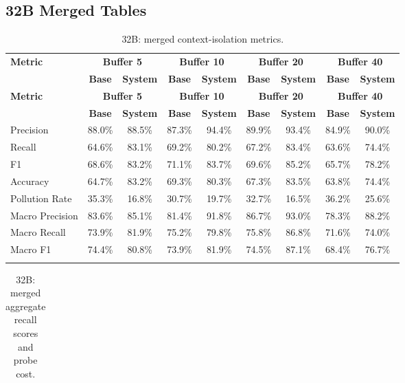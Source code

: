 \begin{landscape}
\subsection{32B Merged Tables}\label{app:32b_merged}
\tiny
\begin{longtable}{@{}p{3.8cm}cccccccc@{}}
\caption{32B: merged context-isolation metrics.}\label{tab:app_32b_context}\\

\toprule
\textbf{Metric} & \multicolumn{2}{c}{\textbf{Buffer 5}} & \multicolumn{2}{c}{\textbf{Buffer 10}} & \multicolumn{2}{c}{\textbf{Buffer 20}} & \multicolumn{2}{c}{\textbf{Buffer 40}} \\
\cmidrule(lr){2-3}\cmidrule(lr){4-5}\cmidrule(lr){6-7}\cmidrule(lr){8-9}
 & \textbf{Base} & \textbf{System} & \textbf{Base} & \textbf{System} & \textbf{Base} & \textbf{System} & \textbf{Base} & \textbf{System} \\
\midrule
\endfirsthead

\toprule
\textbf{Metric} & \multicolumn{2}{c}{\textbf{Buffer 5}} & \multicolumn{2}{c}{\textbf{Buffer 10}} & \multicolumn{2}{c}{\textbf{Buffer 20}} & \multicolumn{2}{c}{\textbf{Buffer 40}} \\
\cmidrule(lr){2-3}\cmidrule(lr){4-5}\cmidrule(lr){6-7}\cmidrule(lr){8-9}
 & \textbf{Base} & \textbf{System} & \textbf{Base} & \textbf{System} & \textbf{Base} & \textbf{System} & \textbf{Base} & \textbf{System} \\
\midrule
\endhead
Precision & 88.0\% & 88.5\% & 87.3\% & 94.4\% & 89.9\% & 93.4\% & 84.9\% & 90.0\% \\
Recall & 64.6\% & 83.1\% & 69.2\% & 80.2\% & 67.2\% & 83.4\% & 63.6\% & 74.4\% \\
F1 & 68.6\% & 83.2\% & 71.1\% & 83.7\% & 69.6\% & 85.2\% & 65.7\% & 78.2\% \\
Accuracy & 64.7\% & 83.2\% & 69.3\% & 80.3\% & 67.3\% & 83.5\% & 63.8\% & 74.4\% \\
Pollution Rate & 35.3\% & 16.8\% & 30.7\% & 19.7\% & 32.7\% & 16.5\% & 36.2\% & 25.6\% \\
Macro Precision & 83.6\% & 85.1\% & 81.4\% & 91.8\% & 86.7\% & 93.0\% & 78.3\% & 88.2\% \\
Macro Recall & 73.9\% & 81.9\% & 75.2\% & 79.8\% & 75.8\% & 86.8\% & 71.6\% & 74.0\% \\
Macro F1 & 74.4\% & 80.8\% & 73.9\% & 81.9\% & 74.5\% & 87.1\% & 68.4\% & 76.7\% \\
\botrule
\end{longtable}
\begin{longtable}{@{}p{3.8cm}cccccccc@{}}
\caption{32B: merged aggregate recall scores and probe cost.}\label{tab:app_32b_recall_agg}\\


\end{longtable}
\end{landscape}
